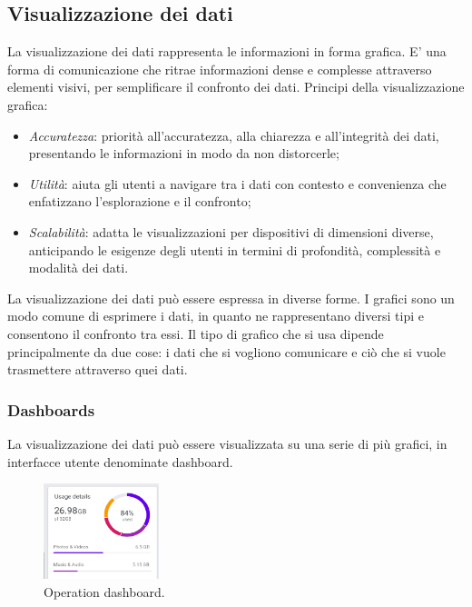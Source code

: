 \documentclass[12pt, a4paper]{report}
\begin{document}
	\subsection{Visualizzazione dei dati}
	La visualizzazione dei dati rappresenta le informazioni in forma grafica. E’ una forma di comunicazione che ritrae informazioni dense e complesse attraverso elementi visivi, per semplificare il confronto dei dati. Principi della visualizzazione grafica:
	\begin{itemize}
		\item \textit{Accuratezza}: priorità all'accuratezza, alla chiarezza e all'integrità dei dati, presentando le informazioni in modo da non distorcerle;
		\item \textit{Utilità}: aiuta gli utenti a navigare tra i dati con contesto e convenienza che enfatizzano l'esplorazione e il confronto;
		\item \textit{Scalabilità}: adatta le visualizzazioni per dispositivi di dimensioni diverse, anticipando le esigenze degli utenti in termini di profondità, complessità e modalità dei dati.
	\end{itemize}
	La visualizzazione dei dati può essere espressa in diverse forme. I grafici sono un modo comune di esprimere i dati, in quanto ne rappresentano diversi tipi e consentono il confronto tra essi. Il tipo di grafico che si usa dipende principalmente da due cose: i dati che si vogliono comunicare e ciò che si vuole trasmettere attraverso quei dati.

	\subsubsection{Dashboards}
	La visualizzazione dei dati può essere visualizzata su una serie di più grafici, in interfacce utente denominate dashboard.
	\begin{figure}[h]
		\centering
		\includegraphics[width=0.3\textwidth]{dashboard} %
		\caption{Operation dashboard.}
	\end{figure}
\end{document}
